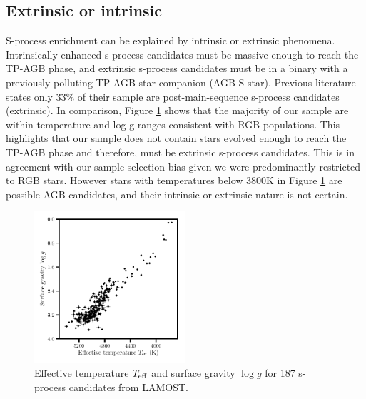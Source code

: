 \documentclass[a4paper,fleqn,usenatbib]{mnras}
\begin{document}
\subsection{Extrinsic or intrinsic}
S-process enrichment can be explained by intrinsic or extrinsic phenomena. Intrinsically enhanced s-process candidates must be massive enough to reach the TP-AGB phase, and extrinsic s-process candidates must be in a binary with a previously polluting TP-AGB star companion (AGB S star). Previous literature \citep{van2017} \hspace{0.3mm} states only 33\% of their sample are post-main-sequence s-process candidates (extrinsic). In comparison, Figure \ref{fig:figure2} shows that the majority of our sample are within temperature and log g ranges consistent with RGB populations. This highlights that our sample does not contain stars evolved enough to reach the TP-AGB phase and therefore, must be extrinsic s-process candidates. This is in agreement with our sample selection bias given we were predominantly restricted to RGB stars. However stars with temperatures below 3800K in Figure \ref{fig:figure2} are possible AGB candidates, and their intrinsic or extrinsic nature is not certain. 

\begin{figure}
	\includegraphics[width=0.5\textwidth]{hrd_new.pdf}
    \caption{Effective temperature $T_{\rm eff}$ and surface gravity $\log{g}$ for 187 s-process candidates from LAMOST.}
    \label{fig:figure2}
\end{figure}
\end{document}
